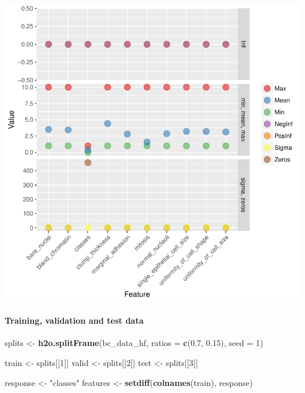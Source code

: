 \documentclass[]{article}
\newenvironment{Shaded}{\begin{snugshade}}{\end{snugshade}}
\newcommand{\KeywordTok}[1]{\textcolor[rgb]{0.13,0.29,0.53}{\textbf{{#1}}}}
\newcommand{\DataTypeTok}[1]{\textcolor[rgb]{0.13,0.29,0.53}{{#1}}}
\newcommand{\DecValTok}[1]{\textcolor[rgb]{0.00,0.00,0.81}{{#1}}}
\newcommand{\FloatTok}[1]{\textcolor[rgb]{0.00,0.00,0.81}{{#1}}}
\newcommand{\StringTok}[1]{\textcolor[rgb]{0.31,0.60,0.02}{{#1}}}
\newcommand{\NormalTok}[1]{{#1}}
\let\oldparagraph\paragraph
\renewcommand{\paragraph}[1]{\oldparagraph{#1}\mbox{}}
\begin{document}
\begin{center}\includegraphics{webinar_code_files/figure-latex/unnamed-chunk-23-1} \end{center}

\paragraph{Training, validation and test
data}\label{training-validation-and-test-data-1}

\begin{Shaded}
\begin{Highlighting}[]
\NormalTok{splits <-}\StringTok{ }\KeywordTok{h2o.splitFrame}\NormalTok{(bc_data_hf, }
                         \DataTypeTok{ratios =} \KeywordTok{c}\NormalTok{(}\FloatTok{0.7}\NormalTok{, }\FloatTok{0.15}\NormalTok{), }
                         \DataTypeTok{seed =} \DecValTok{1}\NormalTok{)}

\NormalTok{train <-}\StringTok{ }\NormalTok{splits[[}\DecValTok{1}\NormalTok{]]}
\NormalTok{valid <-}\StringTok{ }\NormalTok{splits[[}\DecValTok{2}\NormalTok{]]}
\NormalTok{test <-}\StringTok{ }\NormalTok{splits[[}\DecValTok{3}\NormalTok{]]}

\NormalTok{response <-}\StringTok{ "classes"}
\NormalTok{features <-}\StringTok{ }\KeywordTok{setdiff}\NormalTok{(}\KeywordTok{colnames}\NormalTok{(train), response)}
\end{Highlighting}
\end{Shaded}
\end{document}
